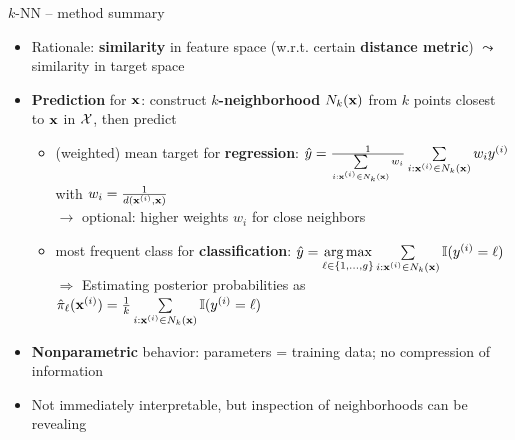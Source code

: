 \begin{frame}{$k$-NN -- method summary}

 
 

\medskip

\begin{itemize}
  \item Rationale: \textbf{similarity} in feature space (w.r.t. certain \textbf{distance metric}) $\leadsto$ similarity in target space 
  \item \textbf{Prediction} for $\mathbf{x}$: construct \textbf{$k$-neighborhood} 
  $N_k(\mathbf{x})$ from $k$ points closest to $\mathbf{x}$ in $\mathcal{X}$, then 
  predict
  \begin{itemize}
    \footnotesize
    \item (weighted) mean target for \textbf{regression}: 
    $\hat{y} = \tfrac{1}{\sum\limits_{i: \mathbf{x}^{(i)} \in N_k(\mathbf{x})} w_i}  
    \sum\limits_{i: \mathbf{x}^{(i)} \in N_k(\mathbf{x})} w_i y^{(i)} $ with $w_i = \tfrac{1}{d(\mathbf{x}^{(i)},\mathbf{x})}$\\
    $\rightarrow$ optional: higher weights $w_i$ for close neighbors
    \item most frequent class for \textbf{classification}: 
    $\hat{y} = \underset{\ell \in \{1, \ldots, g\}}{\mathrm{\operatorname{arg\,max}}} \sum\limits_{i: \mathbf{x}^{(i)} \in N_k(\mathbf{x})} \mathbb{I}(y^{(i)} = \ell)$\\
    $\Rightarrow$ Estimating posterior probabilities as $\hat{\pi}_{\ell}(\mathbf{x}^{(i)})= \frac{1}{k} \sum\limits_{i: \mathbf{x}^{(i)} \in N_k(\mathbf{x})} \mathbb{I}(y^{(i)} = \ell)$
  \end{itemize}
  \item \textbf{Nonparametric} behavior: parameters = training data; no 
  compression of information
  \item Not immediately interpretable, but inspection of neighborhoods can be revealing
\end{itemize}
\end{frame}


